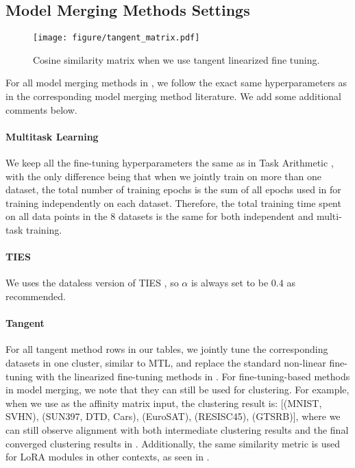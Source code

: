 \subsection{Model Merging Methods Settings}


\begin{figure}[!ht]
    \centering
\texttt{[image: figure/tangent\_matrix.pdf]}
    \caption{Cosine similarity matrix when we use tangent linearized fine tuning.}
    \label{fig:tangent_matrix}
\end{figure}


For all model merging methods in , we follow the exact same hyperparameters as in the corresponding model merging method literature. We add some additional comments below.

\paragraph{Multitask Learning}
We keep all the fine-tuning hyperparameters the same as in Task Arithmetic \citep{ilharco2022editing}, with the only difference being that when we jointly train on more than one dataset, the total number of training epochs is the sum of all epochs used in \citet{ilharco2022editing} for training independently on each dataset. Therefore, the total training time spent on all data points in the 8 datasets is the same for both independent and multi-task training.

\paragraph{TIES} We uses the dataless version of TIES \citep{yadav2024ties}, so $\alpha$ is always set to be $0.4$ as recommended.

\paragraph{Tangent} For all tangent method rows in our tables, we jointly tune the corresponding datasets in one cluster, similar to MTL, and replace the standard non-linear fine-tuning with the linearized fine-tuning methods in \citep{ortiz2024task}. For fine-tuning-based methods in model merging, we note that they can still be used for clustering. For example, when we use  as the affinity matrix input, the clustering result is: [(MNIST, SVHN), (SUN397, DTD, Cars), (EuroSAT), (RESISC45), (GTSRB)], where we can still observe alignment with both intermediate clustering results and the final converged clustering results in . Additionally, the same similarity metric is used for LoRA modules in other contexts, as seen in \citet{ostapenko2024towards}.

